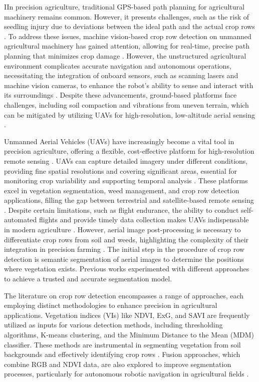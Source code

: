 \documentclass[conference]{IEEEtran}
\begin{document}
IIn precision agriculture, traditional GPS-based path planning for agricultural machinery remains common. However, it presents challenges, such as the risk of seedling injury due to deviations between the ideal path and the actual crop rows \cite{b1}. To address these issues, machine vision-based crop row detection on unmanned agricultural machinery has gained attention, allowing for real-time, precise path planning that minimizes crop damage \cite{b1,b8}. However, the unstructured agricultural environment complicates accurate navigation and autonomous operations, necessitating the integration of onboard sensors, such as scanning lasers and machine vision cameras, to enhance the robot's ability to sense and interact with its surroundings \cite{b2,b3}. Despite these advancements, ground-based platforms face challenges, including soil compaction and vibrations from uneven terrain, which can be mitigated by utilizing UAVs for high-resolution, low-altitude aerial sensing \cite{b10}.

Unmanned Aerial Vehicles (UAVs) have increasingly become a vital tool in precision agriculture, offering a flexible, cost-effective platform for high-resolution remote sensing  \cite{b9,b12}. UAVs can capture detailed imagery under different conditions, providing fine spatial resolutions and covering significant areas, essential for monitoring crop variability and supporting temporal analysis \cite{b10,b12}. These platforms excel in vegetation segmentation, weed management, and crop row detection applications, filling the gap between terrestrial and satellite-based remote sensing \cite{b7,b13}. Despite certain limitations, such as flight endurance, the ability to conduct self-automated flights and provide timely data collection makes UAVs indispensable in modern agriculture \cite{b11,b13}. However, aerial image post-processing is necessary to differentiate crop rows from soil and weeds, highlighting the complexity of their integration in precision farming \cite{b6}.
The initial step in the procedure of crop row detection is semantic segmentation of aerial images to determine the positions where vegetation exists. Previous works experimented with different approaches to achieve a trusted and accurate segmentation model.

The literature on crop row detection encompasses a range of approaches, each employing distinct methodologies to enhance precision in agricultural applications. Vegetation indices (VIs) like NDVI, ExG, and SAVI are frequently utilized as inputs for various detection methods, including thresholding algorithms, K-means clustering, and the Minimum Distance to the Mean (MDM) classifier. These methods are instrumental in segmenting vegetation from soil backgrounds and effectively identifying crop rows \cite{b1,b6,b13}. Fusion approaches, which combine RGB and NDVI data, are also explored to improve segmentation processes, particularly for autonomous robotic navigation in agricultural fields \cite{b5}.
\end{document}
